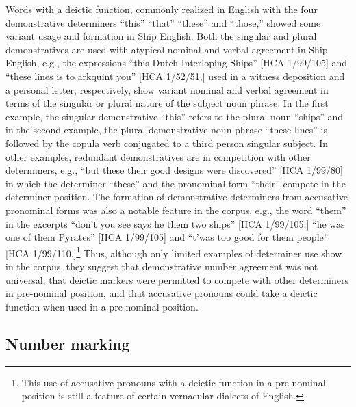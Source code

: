   Words with a deictic function, commonly realized in English with the four demonstrative determiners “this” “that” “these” and “those,” showed some variant usage and formation in Ship English. Both the singular and plural demonstratives are used with atypical nominal and verbal agreement in Ship English, e.g., the expressions “this Dutch Interloping Ships” [HCA 1/99/105] and “these lines is to arkquint you” [HCA 1/52/51,] used in a witness deposition and a personal letter, respectively, show variant nominal and verbal agreement in terms of the singular or plural nature of the subject noun phrase. In the first example, the singular demonstrative “this” refers to the plural noun “ships” and in the second example, the plural demonstrative noun phrase “these lines” is followed by the copula verb conjugated to a third person singular subject. In other examples, redundant demonstratives are in competition with other determiners, e.g., “but these their good designs were discovered” [HCA 1/99/80] in which the determiner “these” and the pronominal form “their” compete in the determiner position. The formation of demonstrative determiners from accusative pronominal forms was also a notable feature in the corpus, e.g., the word “them” in the excerpts “don’t you see says he them two ships” [HCA 1/99/105,] “he was one of them Pyrates” [HCA 1/99/105] and “t’was too good for them people” [HCA 1/99/110.]\footnote{This use of accusative pronouns with a deictic function in a pre-nominal position is still a feature of certain vernacular dialects of English.} Thus, although only limited examples of determiner use show in the corpus, they suggest that demonstrative number agreement was not universal, that deictic markers were permitted to compete with other determiners in pre-nominal position, and that accusative pronouns could take a deictic function when used in a pre-nominal position.  

\subsection{{Number} {marking}}%

